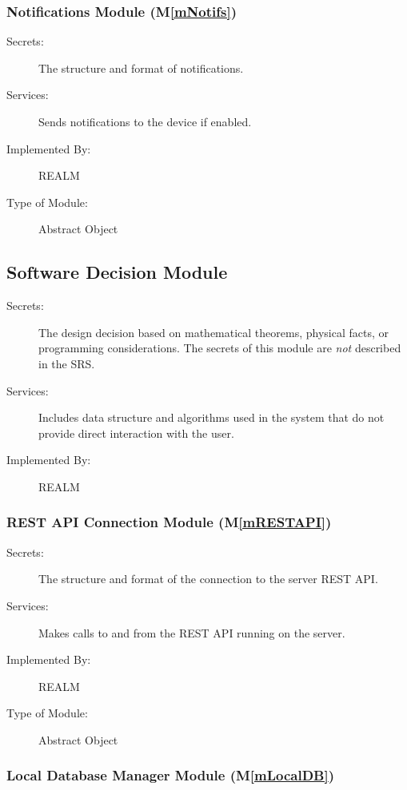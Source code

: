 \documentclass[12pt, titlepage]{article}
\newcommand{\mref}[1]{M\ref{#1}}
\begin{document}
\subsubsection{Notifications Module (\mref{mNotifs})}

\begin{description}
\item[Secrets:]The structure and format of notifications.
\item[Services:]Sends notifications to the device if enabled.
\item[Implemented By:]REALM
\item[Type of Module:]Abstract Object
\end{description}

\subsection{Software Decision Module}

\begin{description}
\item[Secrets:] The design decision based on mathematical theorems, physical
  facts, or programming considerations. The secrets of this module are
  \emph{not} described in the SRS.
\item[Services:] Includes data structure and algorithms used in the system that
  do not provide direct interaction with the user. 
\item[Implemented By:] REALM
\end{description}

\subsubsection{REST API Connection Module (\mref{mRESTAPI})}

\begin{description}
\item[Secrets:]The structure and format of the connection to the server REST API.
\item[Services:]Makes calls to and from the REST API running on the server.
\item[Implemented By:]REALM
\item[Type of Module:]Abstract Object
\end{description}

\subsubsection{Local Database Manager Module (\mref{mLocalDB})}
\end{document}
